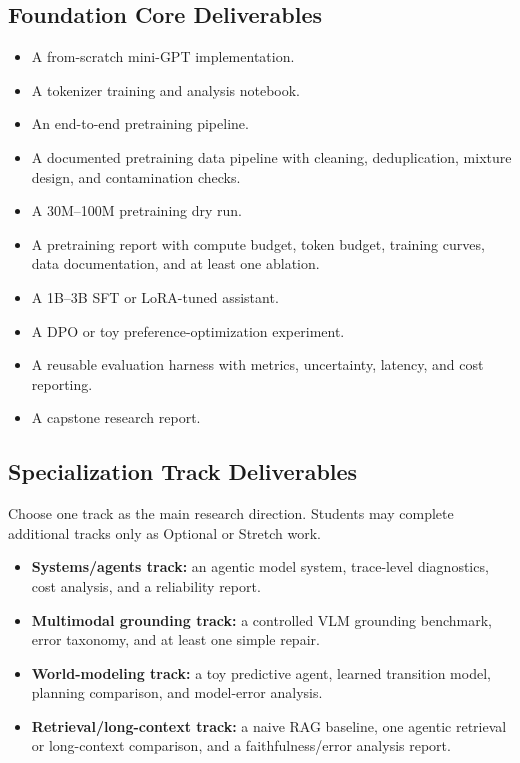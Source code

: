 \documentclass[11pt]{article}
\begin{document}
\subsection*{Foundation Core Deliverables}

\begin{itemize}
    \item A from-scratch mini-GPT implementation.
    \item A tokenizer training and analysis notebook.
    \item An end-to-end pretraining pipeline.
    \item A documented pretraining data pipeline with cleaning, deduplication, mixture design, and contamination checks.
    \item A 30M--100M pretraining dry run.
    \item A pretraining report with compute budget, token budget, training curves, data documentation, and at least one ablation.
    \item A 1B--3B SFT or LoRA-tuned assistant.
    \item A DPO or toy preference-optimization experiment.
    \item A reusable evaluation harness with metrics, uncertainty, latency, and cost reporting.
    \item A capstone research report.
\end{itemize}

\subsection*{Specialization Track Deliverables}

Choose one track as the main research direction. Students may complete additional tracks only as Optional or Stretch work.

\begin{itemize}
    \item \textbf{Systems/agents track:} an agentic model system, trace-level diagnostics, cost analysis, and a reliability report.
    \item \textbf{Multimodal grounding track:} a controlled VLM grounding benchmark, error taxonomy, and at least one simple repair.
    \item \textbf{World-modeling track:} a toy predictive agent, learned transition model, planning comparison, and model-error analysis.
    \item \textbf{Retrieval/long-context track:} a naive RAG baseline, one agentic retrieval or long-context comparison, and a faithfulness/error analysis report.
\end{itemize}
\end{document}
